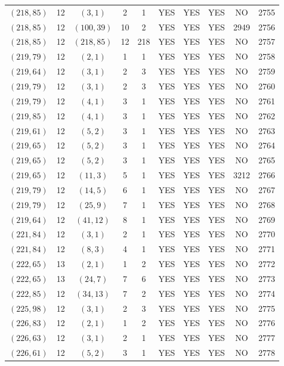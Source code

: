 \begin{longtable}{|c|c|c|c|c|c|c|c|c|c|}
$(218, 85)$ & 12 & $(3, 1)$ & 2 & 1 & YES & YES & YES & NO & 2755\\
$(218, 85)$ & 12 & $(100, 39)$ & 10 & 2 & YES & YES & YES & 2949 & 2756\\
$(218, 85)$ & 12 & $(218, 85)$ & 12 & 218 & YES & YES & YES & NO & 2757\\
$(219, 79)$ & 12 & $(2, 1)$ & 1 & 1 & YES & YES & YES & NO & 2758\\
$(219, 64)$ & 12 & $(3, 1)$ & 2 & 3 & YES & YES & YES & NO & 2759\\
$(219, 79)$ & 12 & $(3, 1)$ & 2 & 3 & YES & YES & YES & NO & 2760\\
$(219, 79)$ & 12 & $(4, 1)$ & 3 & 1 & YES & YES & YES & NO & 2761\\
$(219, 85)$ & 12 & $(4, 1)$ & 3 & 1 & YES & YES & YES & NO & 2762\\
$(219, 61)$ & 12 & $(5, 2)$ & 3 & 1 & YES & YES & YES & NO & 2763\\
$(219, 65)$ & 12 & $(5, 2)$ & 3 & 1 & YES & YES & YES & NO & 2764\\
$(219, 65)$ & 12 & $(5, 2)$ & 3 & 1 & YES & YES & YES & NO & 2765\\
$(219, 65)$ & 12 & $(11, 3)$ & 5 & 1 & YES & YES & YES & 3212 & 2766\\
$(219, 79)$ & 12 & $(14, 5)$ & 6 & 1 & YES & YES & YES & NO & 2767\\
$(219, 79)$ & 12 & $(25, 9)$ & 7 & 1 & YES & YES & YES & NO & 2768\\
$(219, 64)$ & 12 & $(41, 12)$ & 8 & 1 & YES & YES & YES & NO & 2769\\
$(221, 84)$ & 12 & $(3, 1)$ & 2 & 1 & YES & YES & YES & NO & 2770\\
$(221, 84)$ & 12 & $(8, 3)$ & 4 & 1 & YES & YES & YES & NO & 2771\\
$(222, 65)$ & 13 & $(2, 1)$ & 1 & 2 & YES & YES & YES & NO & 2772\\
$(222, 65)$ & 13 & $(24, 7)$ & 7 & 6 & YES & YES & YES & NO & 2773\\
$(222, 85)$ & 12 & $(34, 13)$ & 7 & 2 & YES & YES & YES & NO & 2774\\
$(225, 98)$ & 12 & $(3, 1)$ & 2 & 3 & YES & YES & YES & NO & 2775\\
$(226, 83)$ & 12 & $(2, 1)$ & 1 & 2 & YES & YES & YES & NO & 2776\\
$(226, 63)$ & 12 & $(3, 1)$ & 2 & 1 & YES & YES & YES & NO & 2777\\
$(226, 61)$ & 12 & $(5, 2)$ & 3 & 1 & YES & YES & YES & NO & 2778\\

\end{longtable}
